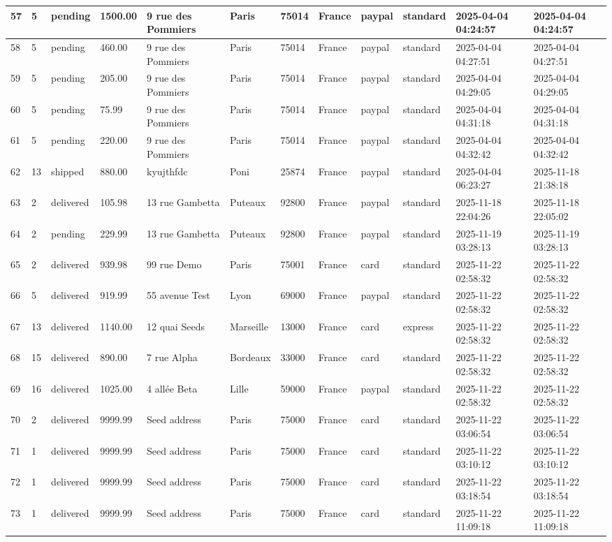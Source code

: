 \begin{longtable}{|l|l|l|l|l|l|l|l|l|l|l|l|}
57 & 5 & pending & 1500.00 & 9 rue des Pommiers & Paris & 75014 & France & paypal & standard & 2025-04-04 04:24:57 & 2025-04-04 04:24:57 \\ \hline 
58 & 5 & pending & 460.00 & 9 rue des Pommiers & Paris & 75014 & France & paypal & standard & 2025-04-04 04:27:51 & 2025-04-04 04:27:51 \\ \hline 
59 & 5 & pending & 205.00 & 9 rue des Pommiers & Paris & 75014 & France & paypal & standard & 2025-04-04 04:29:05 & 2025-04-04 04:29:05 \\ \hline 
60 & 5 & pending & 75.99 & 9 rue des Pommiers & Paris & 75014 & France & paypal & standard & 2025-04-04 04:31:18 & 2025-04-04 04:31:18 \\ \hline 
61 & 5 & pending & 220.00 & 9 rue des Pommiers & Paris & 75014 & France & paypal & standard & 2025-04-04 04:32:42 & 2025-04-04 04:32:42 \\ \hline 
62 & 13 & shipped & 880.00 & kyujthfdc & Poni & 25874 & France & paypal & standard & 2025-04-04 06:23:27 & 2025-11-18 21:38:18 \\ \hline 
63 & 2 & delivered & 105.98 & 13 rue Gambetta & Puteaux & 92800 & France & paypal & standard & 2025-11-18 22:04:26 & 2025-11-18 22:05:02 \\ \hline 
64 & 2 & pending & 229.99 & 13 rue Gambetta & Puteaux & 92800 & France & paypal & standard & 2025-11-19 03:28:13 & 2025-11-19 03:28:13 \\ \hline 
65 & 2 & delivered & 939.98 & 99 rue Demo & Paris & 75001 & France & card & standard & 2025-11-22 02:58:32 & 2025-11-22 02:58:32 \\ \hline 
66 & 5 & delivered & 919.99 & 55 avenue Test & Lyon & 69000 & France & paypal & standard & 2025-11-22 02:58:32 & 2025-11-22 02:58:32 \\ \hline 
67 & 13 & delivered & 1140.00 & 12 quai Seeds & Marseille & 13000 & France & card & express & 2025-11-22 02:58:32 & 2025-11-22 02:58:32 \\ \hline 
68 & 15 & delivered & 890.00 & 7 rue Alpha & Bordeaux & 33000 & France & card & standard & 2025-11-22 02:58:32 & 2025-11-22 02:58:32 \\ \hline 
69 & 16 & delivered & 1025.00 & 4 allée Beta & Lille & 59000 & France & paypal & standard & 2025-11-22 02:58:32 & 2025-11-22 02:58:32 \\ \hline 
70 & 2 & delivered & 9999.99 & Seed address & Paris & 75000 & France & card & standard & 2025-11-22 03:06:54 & 2025-11-22 03:06:54 \\ \hline 
71 & 1 & delivered & 9999.99 & Seed address & Paris & 75000 & France & card & standard & 2025-11-22 03:10:12 & 2025-11-22 03:10:12 \\ \hline 
72 & 1 & delivered & 9999.99 & Seed address & Paris & 75000 & France & card & standard & 2025-11-22 03:18:54 & 2025-11-22 03:18:54 \\ \hline 
73 & 1 & delivered & 9999.99 & Seed address & Paris & 75000 & France & card & standard & 2025-11-22 11:09:18 & 2025-11-22 11:09:18 \\ \hline 
 \end{longtable}

